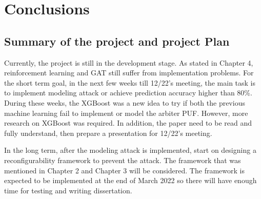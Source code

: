 \chapter{Conclusions}

\section{Summary of the project and project Plan}
Currently, the project is still in the development stage. As stated in Chapter 4, reinforcement learning and GAT still suffer from implementation problems. For the short term goal, in the next few weeks till 12/22's meeting,
the main task is to implement modeling attack or achieve prediction accuracy higher than 80\%. During these weeks, the XGBoost was a new idea to try if both the previous machine learning fail to implement or model the arbiter PUF. 
However, more research on XGBoost was required. In addition, the paper \cite{Reference11} need to be read and fully understand, then prepare a presentation for 12/22's meeting.


In the long term, after the modeling attack is implemented, start on designing a reconfigurability framework to prevent the attack. The framework that was mentioned in Chapter 2 and Chapter 3 will be considered. The framework
is expected to be implemented at the end of March 2022 so there will have enough time for testing and writing dissertation.
